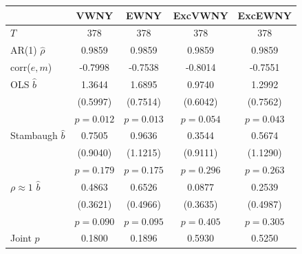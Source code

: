 \begin{tabular}{lcccc}
\toprule
 & VWNY & EWNY & ExcVWNY & ExcEWNY \\
\midrule
$T$ & 378 & 378 & 378 & 378 \\
AR(1) $\hat\rho$ & 0.9859 & 0.9859 & 0.9859 & 0.9859 \\
corr($e,m$) & -0.7998 & -0.7538 & -0.8014 & -0.7551 \\
\midrule
OLS $\hat b$ & 1.3644 & 1.6895 & 0.9740 & 1.2992 \\
 & (0.5997) & (0.7514) & (0.6042) & (0.7562) \\
 & $p=0.012$ & $p=0.013$ & $p=0.054$ & $p=0.043$ \\
Stambaugh $\hat b$ & 0.7505 & 0.9636 & 0.3544 & 0.5674 \\
 & (0.9040) & (1.1215) & (0.9111) & (1.1290) \\
 & $p=0.179$ & $p=0.175$ & $p=0.296$ & $p=0.263$ \\
$\rho\approx1$ $\hat b$ & 0.4863 & 0.6526 & 0.0877 & 0.2539 \\
 & (0.3621) & (0.4966) & (0.3635) & (0.4987) \\
 & $p=0.090$ & $p=0.095$ & $p=0.405$ & $p=0.305$ \\
\midrule
Joint $p$ & 0.1800 & 0.1896 & 0.5930 & 0.5250 \\
\bottomrule
\end{tabular}
